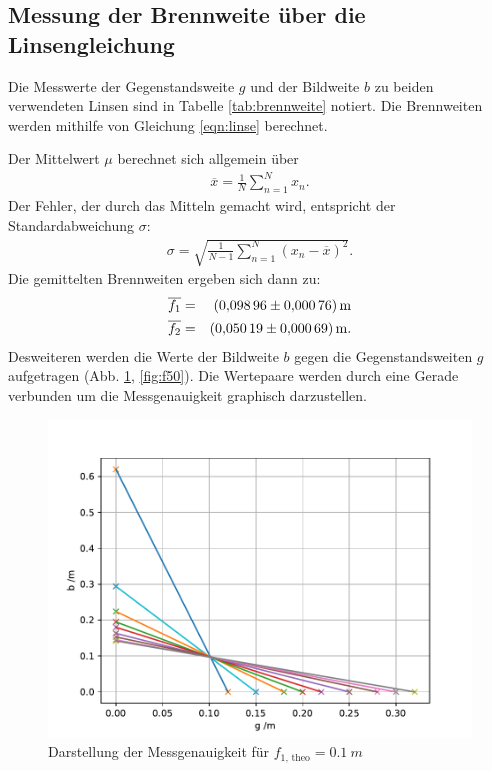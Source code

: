 \subsection{Messung der Brennweite über die Linsengleichung}
Die Messwerte der Gegenstandsweite $g$ und der Bildweite $b$ zu beiden verwendeten Linsen sind in Tabelle \ref{tab:brennweite} notiert.
Die Brennweiten werden mithilfe von Gleichung \eqref{eqn:linse} berechnet.

Der Mittelwert $\mu$ berechnet sich allgemein über
\begin{align}
  \overline{x}= \frac{1}{N} \sum_{n=1}^{N} x_{n}.
  \label{eqn:mu}
\end{align}
Der Fehler, der durch das Mitteln gemacht wird, entspricht der Standardabweichung $\sigma$:
\begin{align}
  \sigma= \sqrt{ \frac{1}{N-1} \sum_{n=1}^{N} ( x_{n} - \overline{x})^2}.
  \label{eqn:std}
\end{align}
Die gemittelten Brennweiten ergeben sich dann zu:
\begin{align*}
  \overline{f_{1}} &=& \SI{0.09896 \pm 0.00076}{m}\\
  \overline{f_{2}} &=& \SI{0.05019 \pm 0.00069}{m}.\\
\end{align*}
Desweiteren werden die Werte der Bildweite $b$ gegen die Gegenstandsweiten $g$ aufgetragen (Abb. \ref{fig:f100}, \ref{fig:f50}).
Die Wertepaare werden durch eine Gerade verbunden um die Messgenauigkeit graphisch darzustellen.
\begin{figure}[h!]
  \centering
  \includegraphics[width=\textwidth]{f100.pdf}
  \caption{Darstellung der Messgenauigkeit für $f_{\text{1, theo}}=\SI{0.1}{m}$}
  \label{fig:f100}
\end{figure}
